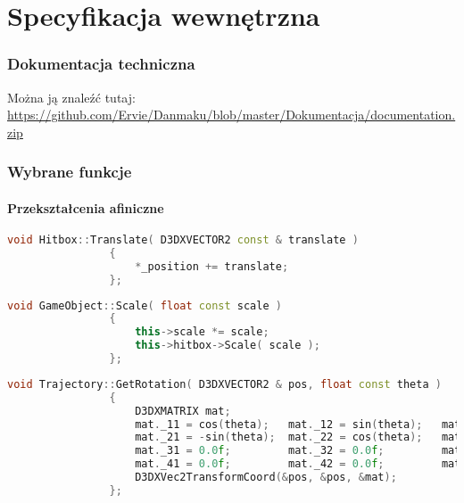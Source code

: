 \newpage
\part{\huge \textbf{Specyfikacja wewnętrzna}}
	\section{Dokumentacja techniczna}
		Można ją znaleźć tutaj:\\\url{https://github.com/Ervie/Danmaku/blob/master/Dokumentacja/documentation.zip}
		
	\section{Wybrane funkcje}
		\subsection{Przekształcenia afiniczne}
			\begin{lstlisting}[language=C++]
				void Hitbox::Translate( D3DXVECTOR2 const & translate )
				{
					*_position += translate;
				};
			\end{lstlisting}
			\begin{lstlisting}[language=C++]
				void GameObject::Scale( float const scale )
				{
					this->scale *= scale;
					this->hitbox->Scale( scale );
				};
			\end{lstlisting}
			\begin{lstlisting}[language=C++]
				void Trajectory::GetRotation( D3DXVECTOR2 & pos, float const theta )
				{
					D3DXMATRIX mat; 
					mat._11 = cos(theta);	mat._12 = sin(theta);	mat._13 = 0.0f;		mat._14 = 0.0f;
					mat._21 = -sin(theta);	mat._22 = cos(theta);	mat._23 = 0.0f;		mat._24 = 0.0f;
					mat._31 = 0.0f;			mat._32 = 0.0f;			mat._33 = 1.0f;		mat._34 = 0.0f;
					mat._41 = 0.0f;			mat._42 = 0.0f;			mat._43 = 0.0f;		mat._44 = 1.0f;
					D3DXVec2TransformCoord(&pos, &pos, &mat);
				};
			\end{lstlisting}
	
